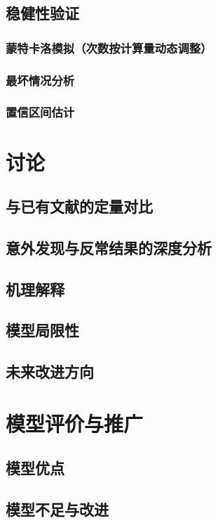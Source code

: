 \documentclass[12pt,a4paper]{article}
\begin{document}
\subsection{稳健性验证}
\subsubsection{蒙特卡洛模拟（次数按计算量动态调整）}
\subsubsection{最坏情况分析}
\subsubsection{置信区间估计}

\section{讨论}  %
\subsection{与已有文献的定量对比}  %
\subsection{意外发现与反常结果的深度分析}
\subsection{机理解释}  %
\subsection{模型局限性}  %
\subsection{未来改进方向}  %

\section{模型评价与推广}
\subsection{模型优点}  %
\subsection{模型不足与改进}
\end{document}
